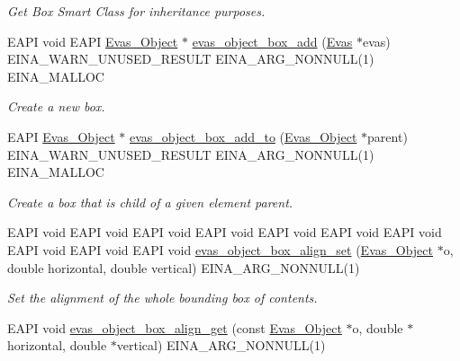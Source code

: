 \begin{DoxyCompactItemize}
\begin{DoxyCompactList}\small\item\em Get Box Smart Class for inheritance purposes. \item\end{DoxyCompactList}\item 
EAPI void EAPI \hyperlink{group__Evas__Object__Group_ga9e19e6dd1f517a0ba437c0114d3e7c97}{Evas\_\-Object} $\ast$ \hyperlink{group__Evas__Object__Box_ga84e87534e6a45a725d59c0366f4e6544}{evas\_\-object\_\-box\_\-add} (\hyperlink{group__Evas__Canvas_ga5ff87cc4ce6bc43e3b640a6d37f73043}{Evas} $\ast$evas) EINA\_\-WARN\_\-UNUSED\_\-RESULT EINA\_\-ARG\_\-NONNULL(1) EINA\_\-MALLOC
\begin{DoxyCompactList}\small\item\em Create a new box. \item\end{DoxyCompactList}\item 
EAPI \hyperlink{group__Evas__Object__Group_ga9e19e6dd1f517a0ba437c0114d3e7c97}{Evas\_\-Object} $\ast$ \hyperlink{group__Evas__Object__Box_gaf332313478211a06a09038755cf139bf}{evas\_\-object\_\-box\_\-add\_\-to} (\hyperlink{group__Evas__Object__Group_ga9e19e6dd1f517a0ba437c0114d3e7c97}{Evas\_\-Object} $\ast$parent) EINA\_\-WARN\_\-UNUSED\_\-RESULT EINA\_\-ARG\_\-NONNULL(1) EINA\_\-MALLOC
\begin{DoxyCompactList}\small\item\em Create a box that is child of a given element {\itshape parent\/}. \item\end{DoxyCompactList}\item 
EAPI void EAPI void EAPI void EAPI void EAPI void EAPI void EAPI void EAPI void EAPI void EAPI void \hyperlink{group__Evas__Object__Box_gae66fe763591e62621cf6352528d97e10}{evas\_\-object\_\-box\_\-align\_\-set} (\hyperlink{group__Evas__Object__Group_ga9e19e6dd1f517a0ba437c0114d3e7c97}{Evas\_\-Object} $\ast$o, double horizontal, double vertical) EINA\_\-ARG\_\-NONNULL(1)\label{group__Evas__Object__Box_gae66fe763591e62621cf6352528d97e10}

\begin{DoxyCompactList}\small\item\em Set the alignment of the whole bounding box of contents. \item\end{DoxyCompactList}\item 
EAPI void \hyperlink{group__Evas__Object__Box_gad87e3a868b14d1a28da7511f95b59673}{evas\_\-object\_\-box\_\-align\_\-get} (const \hyperlink{group__Evas__Object__Group_ga9e19e6dd1f517a0ba437c0114d3e7c97}{Evas\_\-Object} $\ast$o, double $\ast$horizontal, double $\ast$vertical) EINA\_\-ARG\_\-NONNULL(1)\label{group__Evas__Object__Box_gad87e3a868b14d1a28da7511f95b59673}


\end{DoxyCompactItemize}
